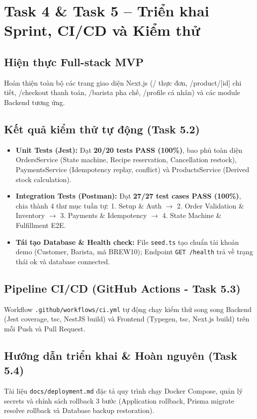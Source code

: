 \documentclass[a4paper]{article}
\begin{document}
\section{Task 4 \& Task 5 – Triển khai Sprint, CI/CD và Kiểm thử}
\subsection{Hiện thực Full-stack MVP}
Hoàn thiện toàn bộ các trang giao diện Next.js (/ thực đơn, /product/[id] chi tiết, /checkout thanh toán, /barista pha chế, /profile cá nhân) và các module Backend tương ứng.

\subsection{Kết quả kiểm thử tự động (Task 5.2)}
\begin{itemize}
    \item \textbf{Unit Tests (Jest):} Đạt \textbf{20/20 tests PASS (100\%)}, bao phủ toàn diện OrdersService (State machine, Recipe reservation, Cancellation restock), PaymentsService (Idempotency replay, conflict) và ProductsService (Derived stock calculation).
    \item \textbf{Integration Tests (Postman):} Đạt \textbf{27/27 test cases PASS (100\%)}, chia thành 4 thư mục tuần tự: 1. Setup \& Auth $\rightarrow$ 2. Order Validation \& Inventory $\rightarrow$ 3. Payments \& Idempotency $\rightarrow$ 4. State Machine \& Fulfillment E2E.
    \item \textbf{Tái tạo Database \& Health check:} File \texttt{seed.ts} tạo chuẩn tài khoản demo (Customer, Barista, mã BREW10); Endpoint \texttt{GET /health} trả về trạng thái ok và database connected.
\end{itemize}

\subsection{Pipeline CI/CD (GitHub Actions - Task 5.3)}
Workflow \texttt{.github/workflows/ci.yml} tự động chạy kiểm thử song song Backend (Jest coverage, tsc, NestJS build) và Frontend (Typegen, tsc, Next.js build) trên mỗi Push và Pull Request.

\subsection{Hướng dẫn triển khai \& Hoàn nguyên (Task 5.4)}
Tài liệu \texttt{docs/deployment.md} đặc tả quy trình chạy Docker Compose, quản lý secrets và chính sách rollback 3 bước (Application rollback, Prisma migrate resolve rollback và Database backup restoration).
\end{document}
